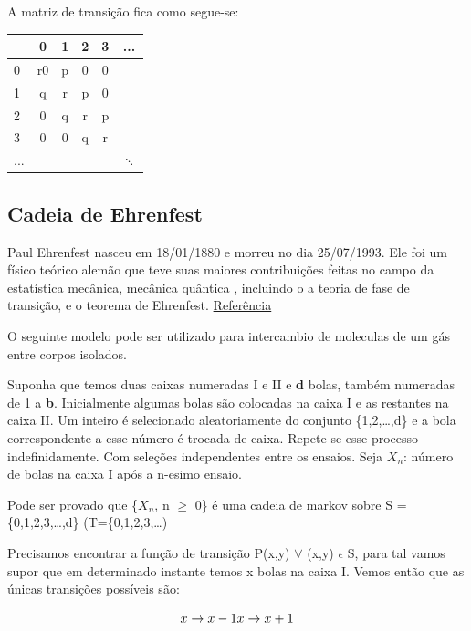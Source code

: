 \documentclass[]{article}
\theoremstyle{definition}
\theoremstyle{definition}
\theoremstyle{definition}
\theoremstyle{remark}
\begin{document}
A matriz de transição fica como segue-se:

\begin{tabular}{l|c|c|c|c|c}
\hline
  & 0 & 1 & 2 & 3 & ...\\
\hline
0 & r0 & p & 0 & 0 & \\
\hline
1 & q & r & p & 0 & \\
\hline
2 & 0 & q & r & p & \\
\hline
3 & 0 & 0 & q & r & \\
\hline
... &  &  &  &  & $\ddots$\\
\hline
\end{tabular}

\subsection{Cadeia de Ehrenfest}\label{cadeia-de-ehrenfest}

Paul Ehrenfest nasceu em 18/01/1880 e morreu no dia 25/07/1993. Ele foi
um físico teórico alemão que teve suas maiores contribuições feitas no
campo da estatística mecânica, mecânica quântica , incluindo o a teoria
de fase de transição, e o teorema de Ehrenfest.
\href{https://en.wikipedia.org/wiki/Paul_Ehrenfest}{Referência}

O seguinte modelo pode ser utilizado para intercambio de moleculas de um
gás entre corpos isolados.

Suponha que temos duas caixas numeradas I e II e \textbf{d} bolas,
também numeradas de 1 a \textbf{b}. Inicialmente algumas bolas são
colocadas na caixa I e as restantes na caixa II. Um inteiro é
selecionado aleatoriamente do conjunto \{1,2,\ldots{},d\} e a bola
correspondente a esse número é trocada de caixa. Repete-se esse processo
indefinidamente. Com seleções independentes entre os ensaios. Seja
\(X_n\): número de bolas na caixa I após a n-esimo ensaio.

Pode ser provado que \{\(X_n\), n \(\geq\) 0\} é uma cadeia de markov
sobre S = \{0,1,2,3,\ldots{},d\} (T=\{0,1,2,3,\ldots{})

Precisamos encontrar a função de transição P(x,y) \(\forall\) (x,y)
\(\epsilon\) S, para tal vamos supor que em determinado instante temos x
bolas na caixa I. Vemos então que as únicas transições possíveis são:

\begin{equation}
x \rightarrow x-1 \\
x \rightarrow x + 1
\end{equation}
\end{document}

